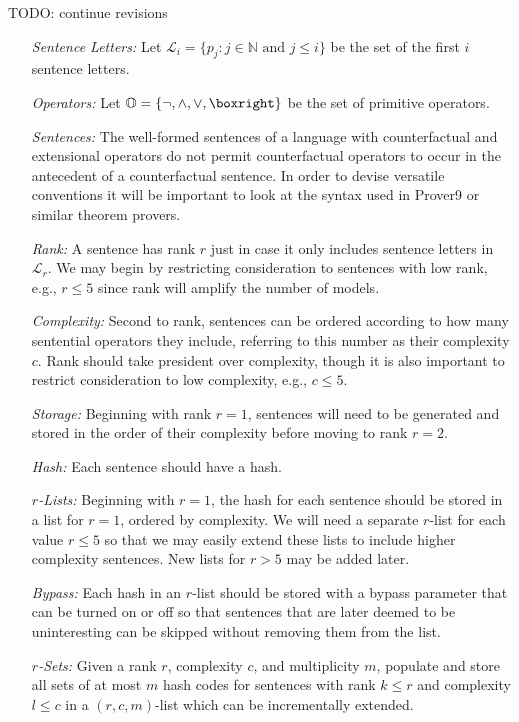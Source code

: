 \documentclass[a4paper, 11pt]{article} %
\newcommand{\set}[1]{\lbrace#1\rbrace} %
\renewcommand{\L}[0]{\mathcal{L}}
\newcommand{\N}[0]{\mathbb{N}}
\renewcommand{\O}[0]{\mathbb{O}}
\begin{document}
TODO: continue revisions 

\begin{enumerate}
  \item[\it Sentence Letters:] Let $\L_i=\set{p_j:j\in\N \text{ and } j\leq i}$ be the set of the first $i$ sentence letters. 
  \item[\it Operators:] Let $\O=\set{\neg,\wedge,\vee,\boxright}$ be the set of primitive operators. 
  \item[\it Sentences:] The well-formed sentences of a language with counterfactual and extensional operators do not permit counterfactual operators to occur in the antecedent of a counterfactual sentence. In order to devise versatile conventions it will be important to look at the syntax used in Prover9 or similar theorem provers.
  \item[\it Rank:] A sentence has rank $r$ just in case it only includes sentence letters in $\L_r$. We may begin by restricting consideration to sentences with low rank, e.g., $r\leq5$ since rank will amplify the number of models.
  \item[\it Complexity:] Second to rank, sentences can be ordered according to how many sentential operators they include, referring to this number as their complexity $c$. Rank should take president over complexity, though it is also important to restrict consideration to low complexity, e.g., $c\leq5$.
  \item[\it Storage:] Beginning with rank $r=1$, sentences will need to be generated and stored in the order of their complexity before moving to rank $r=2$.
  \item[\it Hash:] Each sentence should have a hash.
  \item[\it $r$-Lists:] Beginning with $r=1$, the hash for each sentence should be stored in a list for $r=1$, ordered by complexity. We will need a separate $r$-list for each value $r\leq 5$ so that we may easily extend these lists to include higher complexity sentences. New lists for $r>5$ may be added later. 
  \item[\it Bypass:] Each hash in an $r$-list should be stored with a bypass parameter that can be turned on or off so that sentences that are later deemed to be uninteresting can be skipped without removing them from the list.
  \item[\it $r$-Sets:] Given a rank $r$, complexity $c$, and multiplicity $m$, populate and store all sets of at most $m$ hash codes for sentences with rank $k\leq r$ and complexity $l\leq c$ in a $(r,c,m)$-list which can be incrementally extended. 

\end{enumerate}
\end{document}
